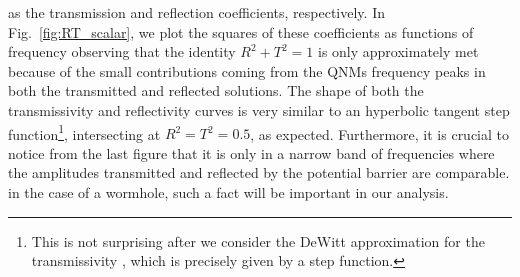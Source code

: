 \documentclass[article,aps,nofootinbib,twocolumn,superscriptaddress]{revtex4-1}
\begin{document}
as the transmission and reflection coefficients, respectively. In Fig.~\ref{fig:RT_scalar}, we plot the squares of these coefficients as functions of frequency observing that the identity $R^2+T^2=1$ is only approximately met because of the small contributions coming from the QNMs frequency peaks in both the transmitted and reflected solutions. The shape of both the transmissivity and reflectivity curves is very similar to an hyperbolic tangent step function\footnote{This is not surprising after we consider the DeWitt approximation for the transmissivity \citep{Frolov:1998wf}, which is precisely given by a step function.}, intersecting at $R^2=T^2=0.5$, as expected. Furthermore, it is crucial to notice from the last figure that it is only in a narrow band of frequencies where the amplitudes transmitted and reflected by the potential barrier are comparable. in the case of a wormhole, such a fact will be important in our analysis.  
\end{document}
